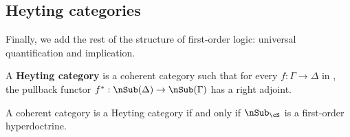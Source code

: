 \subsection{Heyting categories}
\label{sec:heyting-categories}

Finally, we add the rest of the structure of first-order logic: universal quantification and implication.

\begin{defn}
  A \textbf{Heyting category} is a coherent category \cS such that for every $f:\Gamma\to\Delta$ in \cS, the pullback functor $f^*: \sub(\Delta) \to\sub(\Gamma)$ has a right adjoint.
\end{defn}

\begin{thm}\label{thm:heyting-subobjects}
  A coherent category \cS is a Heyting category if and only if $\sub_\cS$ is a first-order hyperdoctrine.
\end{thm}
